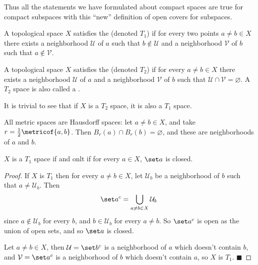 \documentclass[10pt]{article}
\def\qed{\hskip1cm\penalty-100\hbox{}\hfill$\blacksquare$}
\def\mU{\mathcal{U}}
\def\mV{\mathcal{V}}
\begin{document}
Thus all the statements we have formulated about compact spaces are true for compact subspaces with this ``new'' definition of open covers for subspaces.

\begin{defn*}

    A topological space $X$ satisfies the  (denoted $T_1$) if for every two points $a\neq b\in X$ there exists a neighborhood $\mU$ of $a$ such that $b\notin\mU$ and a
    neighborhood $\mV$ of $b$ such that $a\notin\mV$.

    A topological space $X$ satisfies the  (denoted $T_2$) if for every $a\neq b\in X$ there exists a neighborhood $\mU$ of $a$ and a neighborhood $\mV$ of $b$ such that
    $\mU\cap\mV=\varnothing$.
    A $T_2$ space is also called a .

\end{defn*}

It is trivial to see that if $X$ is a $T_2$ space, it is also a $T_1$ space.

\begin{exam*}

    All metric spaces are Hausdorff spaces: let $a\neq b\in X$, and take $r=\frac12\metricof{a,b}$.
    Then $B_r(a)\cap B_r(b)=\varnothing$, and these are neighborhoods of $a$ and $b$.

\end{exam*}

\begin{prop*}

    $X$ is a $T_1$ space if and onlt if for every $a\in X$, $\set a$ is closed.

\end{prop*}

\begin{proof}

    If $X$ is $T_1$ then for every $a\neq b\in X$, let $\mU_b$ be a neighborhood of $b$ such that $a\neq\mU_b$.
    Then
    \[ \set a^c = \bigcup_{a\neq b\in X}\mU_b \]
    since $a\notin\mU_b$ for every $b$, and $b\in\mU_b$ for every $a\neq b$.
    So $\set a^c$ is open as the union of open sets, and so $\set a$ is closed.

    Let $a\neq b\in X$, then $\mU=\set b^c$ is a neighborhood of $a$ which doesn't contain $b$, and $\mV=\set a^c$ is a neighborhood of $b$ which doesn't contain $a$, so $X$ is $T_1$.
    \qed

\end{proof}
\end{document}
